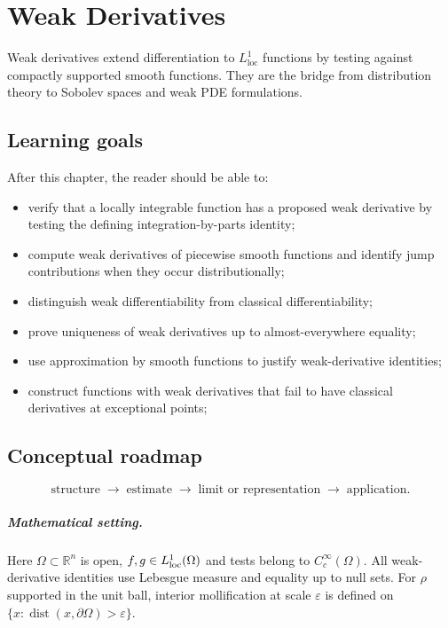\chapter{Weak Derivatives}
\label{ch:iii20}

Weak derivatives extend differentiation to $L^1_{\mathrm{loc}}$ functions by testing against compactly supported smooth functions. They are the bridge from distribution theory to Sobolev spaces and weak PDE formulations.

\section*{Learning goals}
After this chapter, the reader should be able to:
\begin{itemize}
\item verify that a locally integrable function has a proposed weak derivative by testing the defining integration-by-parts identity;
\item compute weak derivatives of piecewise smooth functions and identify jump contributions when they occur distributionally;
\item distinguish weak differentiability from classical differentiability;
\item prove uniqueness of weak derivatives up to almost-everywhere equality;
\item use approximation by smooth functions to justify weak-derivative identities;
\item construct functions with weak derivatives that fail to have classical derivatives at exceptional points;
\end{itemize}
\section*{Conceptual roadmap}
\[
\boxed{\text{structure}\;\longrightarrow\;\text{estimate}\;\longrightarrow\;\text{limit or representation}\;\longrightarrow\;\text{application}.}
\]

\paragraph{Mathematical setting.}
Here $\Omega\subset\mathbb R^n$ is open, $f,g\in L^1_{\rm loc}(\Omega)$ and tests belong to $C_c^\infty(\Omega)$. All weak-derivative identities use Lebesgue measure and equality up to null sets. For $\rho$ supported in the unit ball, interior mollification at scale $\varepsilon$ is defined on $\{x:\operatorname{dist}(x,\partial\Omega)>\varepsilon\}$.

